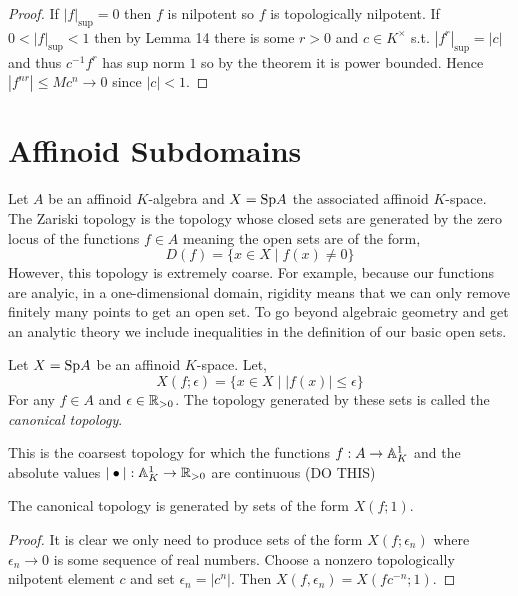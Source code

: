 \documentclass[12pt]{article}
\begin{document}
\begin{proof}
If $|f|_{\sup} = 0$ then $f$ is nilpotent so $f$ is topologically nilpotent. If $0 < |f|_{\sup} < 1$ then by Lemma 14 there is some $r > 0$ and $c \in K^\times$ s.t. $|f^r|_{\sup} = |c|$ and thus $c^{-1} f^r$ has sup norm $1$ so by the theorem it is power bounded. Hence $|f^{nr}| \le M c^n \to 0$ since $|c| < 1$.  
\end{proof}

\section{Affinoid Subdomains}

\begin{rmk}
Let $A$ be an affinoid $K$-algebra and $X = \mathrm{Sp}{A}$ the associated affinoid $K$-space. The Zariski topology is the topology whose closed sets are generated by the zero locus of the functions $f \in A$ meaning the open sets are of the form,
\[ D(f) = \{ x \in X \mid f(x) \neq 0 \} \]
However, this topology is extremely coarse. For example, because our functions are analyic, in a one-dimensional domain, rigidity means that we can only remove finitely many points to get an open set. To go beyond algebraic geometry and get an analytic theory we include inequalities in the definition of our basic open sets.
\end{rmk}

\begin{defn}
Let $X = \mathrm{Sp}{A}$ be an affinoid $K$-space. Let,
\[ X(f ; \epsilon) = \{ x \in X \mid |f(x)| \le \epsilon \} \]
For any $f \in A$ and $\epsilon \in \mathbb{R}_{>0}$. The topology generated by these sets is called the \textit{canonical topology}. 
\end{defn}

\begin{rmk}
This is the coarsest topology for which the functions $f : A \to \mathbb{A}^1_K$ and the absolute values $| \bullet | : \mathbb{A}^1_K \to \mathbb{R}_{>0}$ are continuous (DO THIS)
\end{rmk}

\begin{prop}
The canonical topology is generated by sets of the form $X(f ; 1)$.
\end{prop}

\begin{proof}
It is clear we only need to produce sets of the form $X(f ; \epsilon_n)$ where $\epsilon_n \to 0$ is some sequence of real numbers. Choose a nonzero topologically nilpotent element $c$ and set $\epsilon_n = |c^n|$. Then $X(f, \epsilon_n) = X(f c^{-n} ; 1)$. 
\end{proof}
\end{document}
